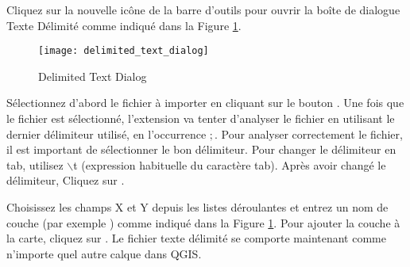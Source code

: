 Cliquez sur la nouvelle icône de la barre d'outils  pour ouvrir la boîte de dialogue Texte Délimité comme indiqué dans la Figure 
\ref{fig:delim_text_plugin_dialog}.

\begin{figure}[ht]
   \begin{center}
   \caption{Delimited Text Dialog \nixcaption}\label{fig:delim_text_plugin_dialog}\smallskip
   \texttt{[image: delimited\_text\_dialog]}
   \end{center}  
\end{figure}

Sélectionnez d'abord le fichier  à importer en cliquant
sur le bouton . Une fois que le fichier est sélectionné, l'extension va tenter d'analyser le fichier
en utilisant le dernier délimiteur utilisé, en l'occurrence \mbox{$;$}. Pour analyser correctement le fichier, il 
est important de sélectionner le bon délimiteur. Pour changer le délimiteur en tab, 
utilisez \mbox{$\backslash$}t (expression habituelle du caractère tab).
Après avoir changé le délimiteur, Cliquez sur .

Choisissez les champs X et Y depuis les listes déroulantes et entrez un nom de couche (par exemple ) comme indiqué dans la Figure \ref{fig:delim_text_plugin_dialog}. Pour ajouter la couche à la carte, cliquez sur . Le fichier texte délimité se comporte maintenant comme n'importe quel autre calque dans QGIS.

